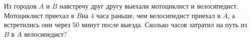 \begin{ex}
	\begin{condition}
		Из городов \( A  \) и \( B  \) навстречу друг другу выехали мотоциклист и велосипедист. Мотоциклист приехал в \( B \)на \( 4 \) часа раньше, чем велосипедист приехал в \( A \), а встретились они через \( 50 \) минут после выезда. Сколько часов затратил на путь из \(  B  \) в \( A  \) велосипедист?
	\end{condition}
\end{ex}